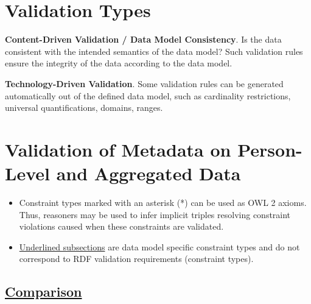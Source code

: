 \documentclass{llncs}
\newcommand{\udash}[1]{%
    \tikz[baseline=(todotted.base)]{
        \node[inner sep=1pt,outer sep=0pt] (todotted) {#1};
        \draw[dashed] (todotted.south west) -- (todotted.south east);
    }%
}%
\begin{document}
\section{Validation Types}

\textbf{Content-Driven Validation / Data Model Consistency}.
Is the data consistent with the intended semantics of the data model?
Such validation rules ensure the integrity of the data according to the data model.

\textbf{Technology-Driven Validation}.
Some validation rules can be generated automatically out of the defined data model, such as cardinality restrictions, universal quantifications, domains, ranges.

\section{Validation of Metadata on Person-Level and Aggregated Data}

\begin{itemize}
  \item Constraint types marked with an asterisk (*) can be used as OWL 2 axioms. Thus, reasoners may be used to infer implicit triples resolving constraint violations caused when these constraints are validated.
	\item \underline{Underlined subsections} are data model specific constraint types and do not correspond to RDF validation requirements (constraint types).
\end{itemize}

\subsection{\underline{Comparison}}
\end{document}
